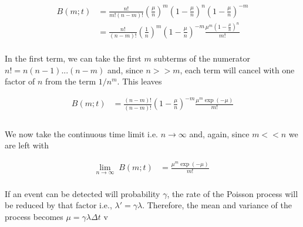 \documentclass{ucetd}
\begin{document}
\begin{align*}
B(m;t) &= \frac{n!}{m!(n-m)!}\left(\frac{\mu}{n}\right)^{m}\left(1-\frac{\mu}{n}\right)^{n}\left(1-\frac{\mu}{n}\right)^{-m}\\
&= \frac{n!}{(n-m)!}\left(\frac{1}{n}\right)^{m}\left(1-\frac{\mu}{n}\right)^{-m}\frac{\mu^{m}\left(1-\frac{\mu}{n}\right)^{n}}{m!}\\
\end{align*}

In the first term, we can take the first $m$ subterms of the numerator $n! = n(n-1)...(n-m)$ and, since $n>>m$, each term will cancel with one factor of $n$ from the term $1/n^{m}$. This leaves

\begin{align*}
B(m;t) &= \frac{(n-m)!}{(n-m)!}\left(1-\frac{\mu}{n}\right)^{-m}\frac{\mu^{m}\exp(-\mu)}{m!}\\\\
\end{align*}

We now take the continuous time limit i.e. $n\rightarrow\infty$ and, again, since $m << n$ we are left with 

\begin{align*}
\underset{n\rightarrow\infty}{\mathrm{lim}} \;\; B(m;t) &= \frac{\mu^{m}\exp(-\mu)}{m!}\\
\end{align*}

If an event can be detected will probability $\gamma$, the rate of the Poisson process will be reduced by that factor i.e., $\lambda' = \gamma\lambda$. Therefore, the mean and variance of the process becomes $\mu = \gamma\lambda\Delta t$
v
\end{document}

